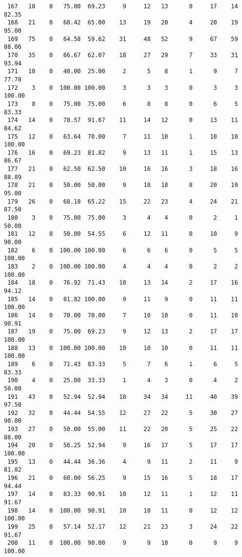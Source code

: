 \begin{verbatim}
 167   18    0   75.00  69.23     9     12   13      0     17    14    82.35
 168   21    0   68.42  65.00    13     19   20      4     20    19    95.00
 169   75    0   64.58  59.62    31     48   52      9     67    59    88.06
 170   35    0   66.67  62.07    18     27   29      7     33    31    93.94
 171   10    0   40.00  25.00     2      5    8      1      9     7    77.78
 172    3    0  100.00 100.00     3      3    3      0      3     3   100.00
 173    8    0   75.00  75.00     6      8    8      0      6     5    83.33
 174   14    0   78.57  91.67    11     14   12      0     13    11    84.62
 175   12    0   63.64  70.00     7     11   10      1     10    10   100.00
 176   16    0   69.23  81.82     9     13   11      1     15    13    86.67
 177   21    0   62.50  62.50    10     16   16      3     18    16    88.89
 178   21    0   50.00  50.00     9     18   18      8     20    19    95.00
 179   26    0   68.18  65.22    15     22   23      4     24    21    87.50
 180    3    0   75.00  75.00     3      4    4      0      2     1    50.00
 181   12    0   50.00  54.55     6     12   11      0     10     9    90.00
 182    6    0  100.00 100.00     6      6    6      0      5     5   100.00
 183    2    0  100.00 100.00     4      4    4      0      2     2   100.00
 184   18    0   76.92  71.43    10     13   14      2     17    16    94.12
 185   14    0   81.82 100.00     9     11    9      0     11    11   100.00
 186   14    0   70.00  70.00     7     10   10      0     11    10    90.91
 187   19    0   75.00  69.23     9     12   13      2     17    17   100.00
 188   13    0  100.00 100.00    10     10   10      0     11    11   100.00
 189    6    0   71.43  83.33     5      7    6      1      6     5    83.33
 190    4    0   25.00  33.33     1      4    3      0      4     2    50.00
 191   43    0   52.94  52.94    18     34   34     11     40    39    97.50
 192   32    0   44.44  54.55    12     27   22      5     30    27    90.00
 193   27    0   50.00  55.00    11     22   20      5     25    22    88.00
 194   20    0   56.25  52.94     9     16   17      5     17    17   100.00
 195   13    0   44.44  36.36     4      9   11      2     11     9    81.82
 196   21    0   60.00  56.25     9     15   16      5     18    17    94.44
 197   14    0   83.33  90.91    10     12   11      1     12    11    91.67
 198   14    0  100.00  90.91    10     10   11      0     12    12   100.00
 199   25    0   57.14  52.17    12     21   23      3     24    22    91.67
 200   11    0  100.00  90.00     9      9   10      0      9     9   100.00

\end{verbatim}
